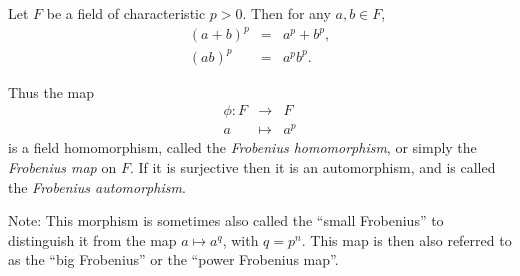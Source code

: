 \documentclass[12pt]{article}
\begin{document}
Let $F$ be a field of characteristic $p>0$. Then for any $a, b \in F$, 
\begin{eqnarray*}
(a + b)^p &=& a^p + b^p,
\\ (ab)^p &=& a^p b^p.
\end{eqnarray*}

Thus the map
$$
\begin{matrix}\phi: F &\to& F 
\\ a &\mapsto& a^p
\end{matrix}
$$
is a field homomorphism, called the \emph{Frobenius homomorphism}, or simply the \emph{Frobenius map} on $F$.
If it is surjective then it is an automorphism, and is called the \emph{Frobenius automorphism}.

Note: This morphism is sometimes also called the ``small Frobenius'' to distinguish it from the map $a \mapsto a^q$, with $q=p^n$. This map is then also referred to as the ``big Frobenius'' or the ``power Frobenius map''.
\end{document}
